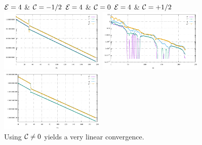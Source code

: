 \begin{center}
${\cal E}=4$ \& ${\cal C}=-1/2$  \hspace{2cm}
${\cal E}=4$ \& ${\cal C}=0$ \hspace{2cm}
${\cal E}=4$ \& ${\cal C}=+1/2$\\
\includegraphics[width=5cm]{python_codes/fieldstone_57/results/E04_Cm0p5/convergence.pdf}
\includegraphics[width=5cm]{python_codes/fieldstone_57/results/E04_C000/convergence.pdf}
\includegraphics[width=5cm]{python_codes/fieldstone_57/results/E04_Cp0p5/convergence.pdf}\\
{\captionfont Using ${\cal C}\neq 0$ yields a very linear convergence.}
\end{center}


